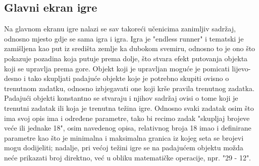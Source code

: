 \documentclass[times, utf8, zavrsni, numeric]{fer}
\begin{document}
		\subsection{Glavni ekran igre}
		Na glavnom ekranu igre nalazi se sav takoreći učenicima zanimljiv sadržaj, odnosno mjesto gdje se sama igra i igra\cite{surfaceview}.  Igra je "endless runner" i tematski je zamišljena kao put iz središta zemlje ka dubokom svemiru, odnosno to je ono što pokazuje
		pozadina koja putuje prema dolje, što stvara efekt putovanja objekta koji se upravlja prema gore. Objekt koji je upravljan moguće je pomicati lijevo-desno i tako skupljati padajuće objekte koje je potrebno skupiti ovisno o trenutnom zadatku,
		odnosno izbjegavati one koji krše pravila trenutnog zadatka. Padajući objekti konstantno se stvaraju i njihov sadržaj ovisi o tome koji je trenutni zadatak ili koja je trenutna težina igre. Odnosno svaki zadatak osim što ima svoj opis ima i određene
		parametre, tako bi recimo zadak "skupljaj brojeve veće ili jednake 18", osim navedenog opisa, relativnog broja 18 imao i definirane parametre kao što je minimalna i maksimalna granica iz kojeg seta se brojevi mogu dodijeliti; nadalje, pri većoj 
		težini igre se na padajućem objektu možda neće prikazati broj direktno, već u obliku matematičke operacije, npr. "29 - 12".
\end{document}
